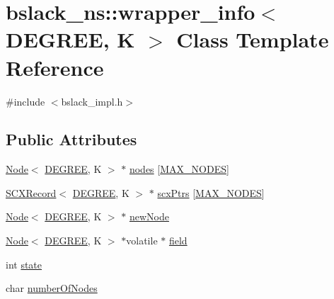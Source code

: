 \hypertarget{classbslack__ns_1_1wrapper__info}{}\section{bslack\+\_\+ns\+:\+:wrapper\+\_\+info$<$ D\+E\+G\+R\+EE, K $>$ Class Template Reference}
\label{classbslack__ns_1_1wrapper__info}


{\ttfamily \#include $<$bslack\+\_\+impl.\+h$>$}

\subsection*{Public Attributes}
\begin{DoxyCompactItemize}
\item 
\hyperlink{structbslack__ns_1_1Node}{Node}$<$ \hyperlink{brown__sigouin__abtree__kcas_2adapter_8h_a5d88b17d70c985f2f2b8e987037fd6dd}{D\+E\+G\+R\+EE}, K $>$ $\ast$ \hyperlink{classbslack__ns_1_1wrapper__info_a2d9b42a29455dc853a04def1360692db}{nodes} \mbox{[}\hyperlink{classbslack__ns_1_1wrapper__info_ab5bcd31a5ba96938aa04b6e43da441c4}{M\+A\+X\+\_\+\+N\+O\+D\+ES}\mbox{]}
\item 
\hyperlink{structbslack__ns_1_1SCXRecord}{S\+C\+X\+Record}$<$ \hyperlink{brown__sigouin__abtree__kcas_2adapter_8h_a5d88b17d70c985f2f2b8e987037fd6dd}{D\+E\+G\+R\+EE}, K $>$ $\ast$ \hyperlink{classbslack__ns_1_1wrapper__info_ac26a8c05631adb0c2bc967a2ca5c2153}{scx\+Ptrs} \mbox{[}\hyperlink{classbslack__ns_1_1wrapper__info_ab5bcd31a5ba96938aa04b6e43da441c4}{M\+A\+X\+\_\+\+N\+O\+D\+ES}\mbox{]}
\item 
\hyperlink{structbslack__ns_1_1Node}{Node}$<$ \hyperlink{brown__sigouin__abtree__kcas_2adapter_8h_a5d88b17d70c985f2f2b8e987037fd6dd}{D\+E\+G\+R\+EE}, K $>$ $\ast$ \hyperlink{classbslack__ns_1_1wrapper__info_ac1a673ff65ab005f74a70c12ec36ac77}{new\+Node}
\item 
\hyperlink{structbslack__ns_1_1Node}{Node}$<$ \hyperlink{brown__sigouin__abtree__kcas_2adapter_8h_a5d88b17d70c985f2f2b8e987037fd6dd}{D\+E\+G\+R\+EE}, K $>$ $\ast$volatile $\ast$ \hyperlink{classbslack__ns_1_1wrapper__info_a2990081b668c96ebdae6412f1b8086ff}{field}
\item 
int \hyperlink{classbslack__ns_1_1wrapper__info_a8c1a85f3b95ec25948a888edf88b6536}{state}
\item 
char \hyperlink{classbslack__ns_1_1wrapper__info_ab3e7f2a621bdeb213e54e45a98cc3d8d}{number\+Of\+Nodes}

\end{DoxyCompactItemize}
